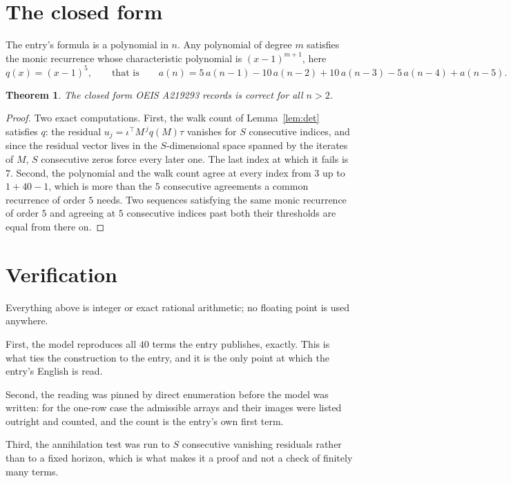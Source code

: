 \documentclass[11pt,a4paper]{article}
\theoremstyle{plain}
\newtheorem{theorem}{Theorem}
\theoremstyle{definition}
\begin{document}
\section{The closed form}

The entry's formula is a polynomial in $n$. Any polynomial of degree $m$ satisfies the monic
recurrence whose characteristic polynomial is $(x-1)^{m+1}$, here
\[
q(x)=(x-1)^{5},\qquad\text{that is}\qquad a(n)=5\,a(n-1) - 10\,a(n-2) + 10\,a(n-3) - 5\,a(n-4) + a(n-5).
\]

\begin{theorem}
The closed form OEIS A219293 records is correct for all $n>2$.
\end{theorem}

\begin{proof}
Two exact computations. First, the walk count of Lemma~\ref{lem:det} satisfies $q$: the
residual $u_j=\iota^{\!\top}M^{\,j}q(M)\tau$ vanishes for $S$ consecutive indices, and
since the residual vector lives in the $S$-dimensional space spanned by the iterates of $M$,
$S$ consecutive zeros force every later one. The last index at which it fails is $7$.
Second, the polynomial and the walk count agree at every index from $3$ up to
$1 + 40 - 1$, which is more than the $5$ consecutive agreements a
common recurrence of order $5$ needs. Two sequences satisfying the same monic recurrence
of order $5$ and agreeing at $5$ consecutive indices past both their thresholds are
equal from there on.
\end{proof}

\section{Verification}

Everything above is integer or exact rational arithmetic; no floating point is used anywhere.

First, the model reproduces all $40$ terms the entry publishes, exactly. This is what
ties the construction to the entry, and it is the only point at which the entry's English is
read.

Second, the reading was pinned by direct enumeration before the model was written: for the
one-row case the admissible arrays and their images were listed outright and counted, and the
count is the entry's own first term.

Third, the annihilation test was run to $S$ consecutive vanishing residuals rather than to a
fixed horizon, which is what makes it a proof and not a check of finitely many terms.
\end{document}
